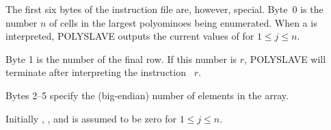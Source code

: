 The first six bytes of the instruction file are,
however, special.
Byte~0 is the number $n$ of cells in the largest polyominoes being
enumerated. When a  is interpreted, {\mc POLYSLAVE}
outputs the current values of  for $1\le j\le n$.

Byte 1 is the number of the final row. If this number is $r$, {\mc
POLYSLAVE} will terminate after interpreting the instruction ~$r$.

Bytes 2--5 specify the (big-endian) number of elements in the 
array.

Initially , , and  is assumed to be zero
for $1\le j\le n$.

